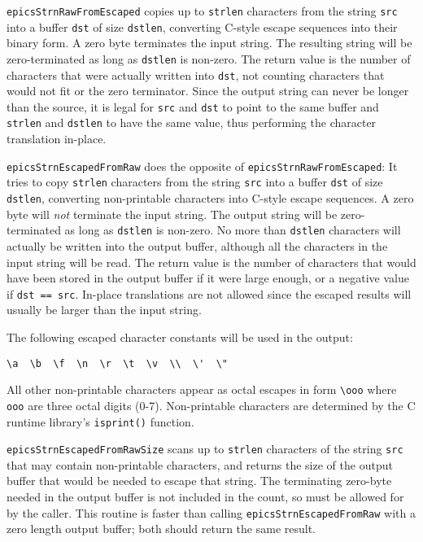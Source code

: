 
\verb|epicsStrnRawFromEscaped| copies up to \verb|strlen| characters from the string \verb|src| into a buffer \verb|dst| of size \verb|dstlen|, converting C-style escape sequences into their binary form.
A zero byte terminates the input string.
The resulting string will be zero-terminated as long as \verb|dstlen| is non-zero.
The return value is the number of characters that were actually written into \verb|dst|, not counting characters that would not fit or the zero terminator.
Since the output string can never be longer than the source, it is legal for \verb|src| and \verb|dst| to point to the same buffer and \verb|strlen| and \verb|dstlen| to have the same value, thus performing the character translation in-place.

\verb|epicsStrnEscapedFromRaw| does the opposite of \verb|epicsStrnRawFromEscaped|:
It tries to copy \verb|strlen| characters from the string \verb|src| into a buffer \verb|dst| of size \verb|dstlen|, converting non-printable characters into C-style escape sequences.
A zero byte will \emph{not} terminate the input string.
The output string will be zero-terminated as long as \verb|dstlen| is non-zero.
No more than \verb|dstlen| characters will actually be written into the output buffer, although all the characters in the input string will be read.
The return value is the number of characters that would have been stored in the output buffer if it were large enough, or a negative value if \verb|dst == src|.
In-place translations are not allowed since the escaped results will usually be larger than the input string.

The following escaped character constants will be used in the output:

\begin{verbatim}
\a  \b  \f  \n  \r  \t  \v  \\  \'  \"
\end{verbatim}

All other non-printable characters appear as octal escapes in form \verb|\ooo| where \verb|ooo| are three octal digits (0-7).
Non-printable characters are determined by the C runtime library's \verb|isprint()| function.

\verb|epicsStrnEscapedFromRawSize| scans up to \verb|strlen| characters of the string \verb|src| that may contain non-printable characters, and returns the size of the output buffer that would be needed to escape that string.
The terminating zero-byte needed in the output buffer is not included in the count, so must be allowed for by the caller.
This routine is faster than calling \verb|epicsStrnEscapedFromRaw| with a zero length output buffer; both should return the same result.

